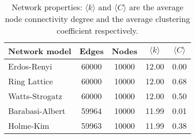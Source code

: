 \begin{table}[h!]
\centering
\caption{Network properties: $\langle k \rangle$ and $\langle C \rangle$ are the average node connectivity degree and the average clustering coefficient respectively. }
\label{tab:networks}
\begin{tabular}{lcccc}
\toprule
         Network model &  Edges &  Nodes & $\langle k \rangle$ & $\langle C \rangle$ \\  %
\midrule
     Erdos-Renyi &  60000 &  10000 & 12.00 &  0.00 \\
    Ring Lattice &  60000 &  10000 & 12.00 &  0.68 \\
  Watts-Strogatz &  60000 &  10000 & 12.00 &  0.50 \\
 Barabasi-Albert &  59964 &  10000 & 11.99 &  0.01 \\
       Holme-Kim &  59963 &  10000 & 11.99 &  0.38 \\
\bottomrule
\end{tabular}
\end{table}
